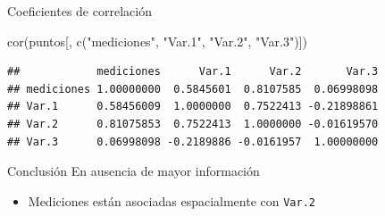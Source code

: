 \documentclass[
  11pt,
  ignorenonframetext,
]{beamer}
\newenvironment{Shaded}{}{}
\newcommand{\FunctionTok}[1]{\textcolor[rgb]{0.02,0.16,0.49}{#1}}
\newcommand{\NormalTok}[1]{#1}
\newcommand{\StringTok}[1]{\textcolor[rgb]{0.25,0.44,0.63}{#1}}
\providecommand{\tightlist}{%
  \setlength{\itemsep}{0pt}\setlength{\parskip}{0pt}}
\begin{document}
\begin{frame}[fragile]{Coeficientes de correlación}
\protect\hypertarget{coeficientes-de-correlaciuxf3n}{}
\begin{Shaded}
\begin{Highlighting}[]
\FunctionTok{cor}\NormalTok{(puntos[, }\FunctionTok{c}\NormalTok{(}\StringTok{"mediciones"}\NormalTok{, }\StringTok{"Var.1"}\NormalTok{, }\StringTok{"Var.2"}\NormalTok{, }\StringTok{"Var.3"}\NormalTok{)])}
\end{Highlighting}
\end{Shaded}

\begin{verbatim}
##            mediciones      Var.1      Var.2       Var.3
## mediciones 1.00000000  0.5845601  0.8107585  0.06998098
## Var.1      0.58456009  1.0000000  0.7522413 -0.21898861
## Var.2      0.81075853  0.7522413  1.0000000 -0.01619570
## Var.3      0.06998098 -0.2189886 -0.0161957  1.00000000
\end{verbatim}
\end{frame}

\begin{frame}[fragile]{Conclusión}
\protect\hypertarget{conclusiuxf3n}{}
En ausencia de mayor información

\begin{itemize}
\tightlist
\item
  Mediciones están asociadas espacialmente con \texttt{Var.2}
\end{itemize}
\end{frame}
\end{document}
